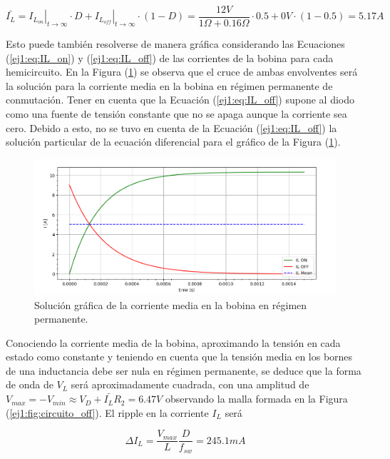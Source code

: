 \begin{equation}
	\bar{I_L} = \left. I_{L_{on}}\right|_{t \rightarrow \infty} \cdot D + \left. I_{L_{off}}\right|_{t \rightarrow \infty} \cdot (1-D) = \frac{12V}{1\Omega + 0.16\Omega} \cdot 0.5 + 0V \cdot (1-0.5) = 5.17A
\label{ej1:eq:ilbar}
\end{equation}

Esto puede también resolverse de manera gráfica considerando las Ecuaciones (\ref{ej1:eq:IL_on}) y (\ref{ej1:eq:IL_off}) de las corrientes de la bobina para cada hemicircuito. En la Figura (\ref{ej1:fig:ILmediagrafico}) se observa que el cruce de ambas envolventes será la solución para la corriente media en la bobina en régimen permanente de conmutación. Tener en cuenta que la Ecuación (\ref{ej1:eq:IL_off}) supone al diodo como una fuente de tensión constante que no se apaga aunque la corriente sea cero. Debido a esto, no se tuvo en cuenta de la Ecuación (\ref{ej1:eq:IL_off}) la solución particular de la ecuación diferencial para el gráfico de la Figura (\ref{ej1:fig:ILmediagrafico}).

\begin{figure}[H]
	\centering
	\includegraphics[width=0.8\linewidth]{ImagenesEjercicio-1/solgraficaIL}
	\caption{Solución gráfica de la corriente media en la bobina en régimen permanente.}
	\label{ej1:fig:ILmediagrafico}
\end{figure}

Conociendo la corriente media de la bobina, aproximando la tensión en cada estado como constante y teniendo en cuenta que la tensión media en los bornes de una inductancia debe ser nula en régimen permanente, se deduce que la forma de onda de $V_L$ será aproximadamente cuadrada, con una amplitud de $V_{max} = -V_{min} \approx V_D + \bar{I_L}R_2 = 6.47V$ observando la malla formada en la Figura (\ref{ej1:fig:circuito_off}). El ripple en la corriente $I_L$ será 

\begin{equation}
\Delta I_L = \frac{V_{max}}{L}\frac{D}{f_{sw}} = 245.1mA
\end{equation}

